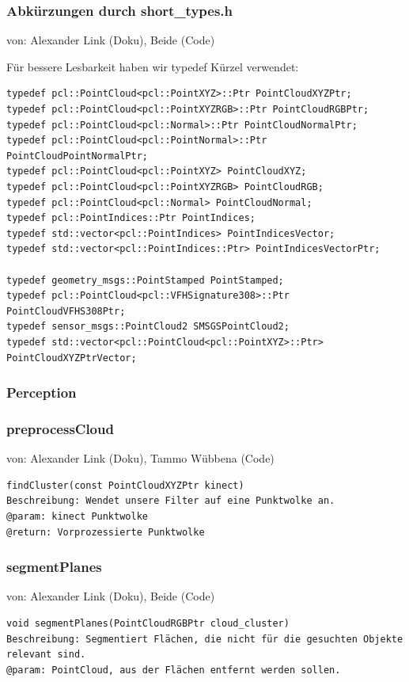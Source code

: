 \documentclass{suturo}
\makeatletter
\newcommand{\chapterauthor}[1]{%
  {\parindent0pt\vspace*{-27pt}%
  \linespread{0}\small\begin{flushright}von: #1\end{flushright}%
  \par\nobreak\vspace*{0pt}}
  \@afterheading%
}
\makeatother
\begin{document}
\subsubsection{Abkürzungen durch short\_types.h}
\chapterauthor{Alexander Link (Doku), Beide (Code)}
Für bessere Lesbarkeit haben wir typedef Kürzel verwendet:
\begin{verbatim}
typedef pcl::PointCloud<pcl::PointXYZ>::Ptr PointCloudXYZPtr;
typedef pcl::PointCloud<pcl::PointXYZRGB>::Ptr PointCloudRGBPtr;
typedef pcl::PointCloud<pcl::Normal>::Ptr PointCloudNormalPtr;
typedef pcl::PointCloud<pcl::PointNormal>::Ptr PointCloudPointNormalPtr;
typedef pcl::PointCloud<pcl::PointXYZ> PointCloudXYZ;
typedef pcl::PointCloud<pcl::PointXYZRGB> PointCloudRGB;
typedef pcl::PointCloud<pcl::Normal> PointCloudNormal;
typedef pcl::PointIndices::Ptr PointIndices;
typedef std::vector<pcl::PointIndices> PointIndicesVector;
typedef std::vector<pcl::PointIndices::Ptr> PointIndicesVectorPtr;

typedef geometry_msgs::PointStamped PointStamped;
typedef pcl::PointCloud<pcl::VFHSignature308>::Ptr PointCloudVFHS308Ptr;
typedef sensor_msgs::PointCloud2 SMSGSPointCloud2;
typedef std::vector<pcl::PointCloud<pcl::PointXYZ>::Ptr> PointCloudXYZPtrVector;
\end{verbatim}

\subsubsection*{Perception}

\subsubsection{preprocessCloud}
\chapterauthor{Alexander Link (Doku), Tammo Wübbena (Code)}
\begin{verbatim}
findCluster(const PointCloudXYZPtr kinect)
Beschreibung: Wendet unsere Filter auf eine Punktwolke an.
@param: kinect Punktwolke
@return: Vorprozessierte Punktwolke
\end{verbatim}\label{func:preprocesscloud}

\subsubsection{segmentPlanes}
\chapterauthor{Alexander Link (Doku), Beide (Code)}
\begin{verbatim}
void segmentPlanes(PointCloudRGBPtr cloud_cluster)
Beschreibung: Segmentiert Flächen, die nicht für die gesuchten Objekte
relevant sind.
@param: PointCloud, aus der Flächen entfernt werden sollen.
\end{verbatim}\label{func:segmentplanes}
\end{document}
